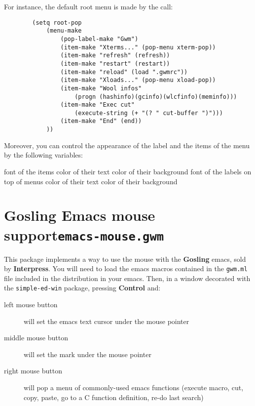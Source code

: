 For instance, the default root menu is made by the call:

{\exemplefont\begin{verbatim}
        (setq root-pop
            (menu-make
                (pop-label-make "Gwm")
                (item-make "Xterms..." (pop-menu xterm-pop))
                (item-make "refresh" (refresh))
                (item-make "restart" (restart))
                (item-make "reload" (load ".gwmrc"))
                (item-make "Xloads..." (pop-menu xload-pop))
                (item-make "Wool infos" 
                    (progn (hashinfo)(gcinfo)(wlcfinfo)(meminfo)))
                (item-make "Exec cut" 
                    (execute-string (+ "(? " cut-buffer ")")))
                (item-make "End" (end))
            ))
\end{verbatim}}

Moreover, you can control the appearance of the label and the items of the menu by the following variables:

\begin{description}
 font of the items
 color of their text
 color of their background
 font of the labels on top of menus
 color of their text
 color of their background
\end{description}

\section{Gosling Emacs mouse support\hfill{\tt emacs-mouse.gwm}}
\label{emacs-mouse}

This package implements a way to use the mouse with the {\bf Gosling} emacs,
sold by {\bf Interpress}. You will need to load the emacs macros contained
in the {\tt gwm.ml} file included in the distribution in your emacs. Then,
in a window decorated with the {\tt simple-ed-win} package, pressing
{\bf Control} and:

\begin{description}
\item[left mouse button] will set the emacs text cursor under the mouse
pointer
\item[middle mouse button] will set the mark under the mouse pointer
\item[right mouse button] will pop a menu of commonly-used emacs functions
(execute macro, cut, copy, paste, go to a C function definition, re-do last
search)
\end{description}


